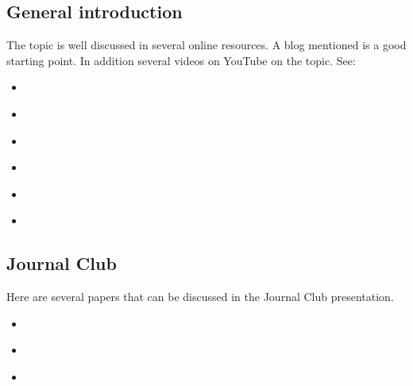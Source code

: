 \documentclass{article}
\begin{document}
\subsection{General introduction}
The topic is well discussed in several online resources. A blog mentioned is a good starting point. In addition several videos on YouTube on the topic. See:
\begin{itemize}
    \item \textcite{GranularFlow_Macuyiko2017part1}
    \item \textcite{GranularFlow_Macuyiko2017part2}
    \item \textcite{GranularFlow_Macuyiko2018part3}
    \item \textcite{GranularFlow_Macuyiko2020part4}
    \item \textcite{GranularFlow_Wheel2009}
    \item \textcite{GranularFlow_Pierre2020}
        
\end{itemize}

\subsection{Journal Club}
Here are several papers that can be discussed in the Journal Club presentation.
\begin{itemize}
    \item \textcite{GranularFlow_Baxter1990}
    \item \textcite{GranularFlow_Castro2021}
    \item \textcite{GranularFlow_Kozicki2005}
\end{itemize}

\printbibliography %
\end{document}
